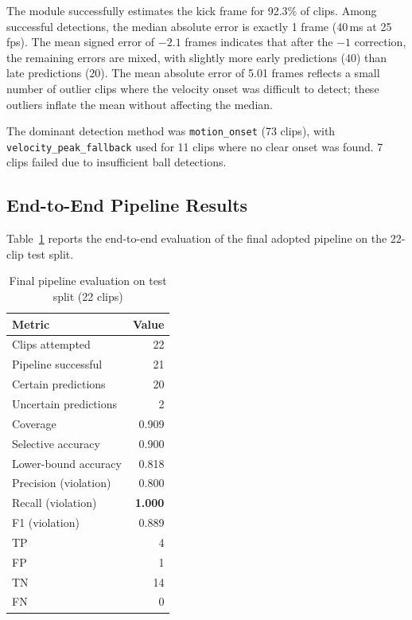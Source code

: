 \documentclass[12pt,a4paper,twoside]{article}
\begin{document}
The module successfully estimates the kick frame for 92.3\% of clips.
Among successful detections, the median absolute error is exactly 1 frame
(40\,ms at 25\,fps). The mean signed error of $-2.1$ frames indicates that
after the $-1$ correction, the remaining errors are mixed, with slightly more
early predictions (40) than late predictions (20). The mean absolute error
of 5.01 frames reflects a small number of outlier clips where the velocity
onset was difficult to detect; these outliers inflate the mean without
affecting the median.

The dominant detection method was \texttt{motion\_onset} (73 clips), with
\texttt{velocity\_peak\_fallback} used for 11 clips where no clear onset was
found. 7 clips failed due to insufficient ball detections.

\subsection{End-to-End Pipeline Results}

Table~\ref{tab:final_pipeline} reports the end-to-end evaluation of the final
adopted pipeline on the 22-clip test split.

\begin{table}[H]
  \centering
  \caption{Final pipeline evaluation on test split (22 clips)}
  \label{tab:final_pipeline}
  \begin{tabular}{lr}
    \toprule
    Metric & Value \\
    \midrule
    Clips attempted & 22 \\
    Pipeline successful & 21 \\
    Certain predictions & 20 \\
    Uncertain predictions & 2 \\
    \midrule
    Coverage & 0.909 \\
    Selective accuracy & 0.900 \\
    Lower-bound accuracy & 0.818 \\
    \midrule
    Precision (violation) & 0.800 \\
    Recall (violation) & \textbf{1.000} \\
    F1 (violation) & 0.889 \\
    \midrule
    TP & 4 \\
    FP & 1 \\
    TN & 14 \\
    FN & 0 \\
    \bottomrule
  \end{tabular}
\end{table}
\end{document}
